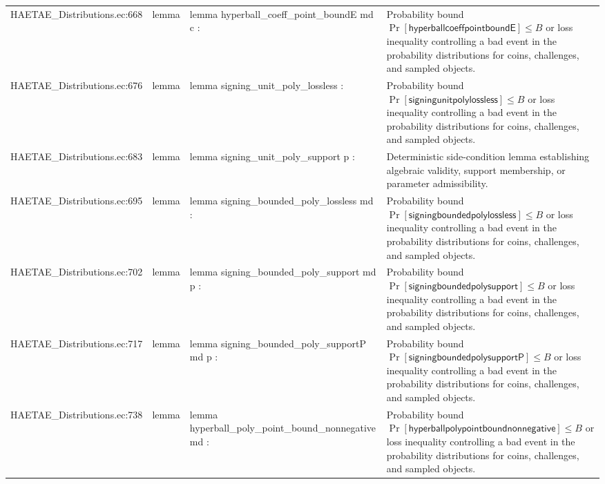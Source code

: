 \documentclass[10pt]{article}
\begin{document}
\begin{longtable}{L{0.11\textwidth}L{0.055\textwidth}L{0.385\textwidth}L{0.41\textwidth}}
HAETAE\_\allowbreak{}Distributions.\allowbreak{}ec:\allowbreak{}668 & lemma & {\ttfamily\scriptsize lemma hyperball\_\allowbreak{}coeff\_\allowbreak{}point\_\allowbreak{}boundE md c :} & Probability bound $\Pr[\mathsf{hyperballcoeffpointboundE}]\le B$ or loss inequality controlling a bad event in the probability distributions for coins, challenges, and sampled objects. \\
HAETAE\_\allowbreak{}Distributions.\allowbreak{}ec:\allowbreak{}676 & lemma & {\ttfamily\scriptsize lemma signing\_\allowbreak{}unit\_\allowbreak{}poly\_\allowbreak{}lossless :} & Probability bound $\Pr[\mathsf{signingunitpolylossless}]\le B$ or loss inequality controlling a bad event in the probability distributions for coins, challenges, and sampled objects. \\
HAETAE\_\allowbreak{}Distributions.\allowbreak{}ec:\allowbreak{}683 & lemma & {\ttfamily\scriptsize lemma signing\_\allowbreak{}unit\_\allowbreak{}poly\_\allowbreak{}support p :} & Deterministic side-condition lemma establishing algebraic validity, support membership, or parameter admissibility. \\
HAETAE\_\allowbreak{}Distributions.\allowbreak{}ec:\allowbreak{}695 & lemma & {\ttfamily\scriptsize lemma signing\_\allowbreak{}bounded\_\allowbreak{}poly\_\allowbreak{}lossless md :} & Probability bound $\Pr[\mathsf{signingboundedpolylossless}]\le B$ or loss inequality controlling a bad event in the probability distributions for coins, challenges, and sampled objects. \\
HAETAE\_\allowbreak{}Distributions.\allowbreak{}ec:\allowbreak{}702 & lemma & {\ttfamily\scriptsize lemma signing\_\allowbreak{}bounded\_\allowbreak{}poly\_\allowbreak{}support md p :} & Probability bound $\Pr[\mathsf{signingboundedpolysupport}]\le B$ or loss inequality controlling a bad event in the probability distributions for coins, challenges, and sampled objects. \\
HAETAE\_\allowbreak{}Distributions.\allowbreak{}ec:\allowbreak{}717 & lemma & {\ttfamily\scriptsize lemma signing\_\allowbreak{}bounded\_\allowbreak{}poly\_\allowbreak{}supportP md p :} & Probability bound $\Pr[\mathsf{signingboundedpolysupportP}]\le B$ or loss inequality controlling a bad event in the probability distributions for coins, challenges, and sampled objects. \\
HAETAE\_\allowbreak{}Distributions.\allowbreak{}ec:\allowbreak{}738 & lemma & {\ttfamily\scriptsize lemma hyperball\_\allowbreak{}poly\_\allowbreak{}point\_\allowbreak{}bound\_\allowbreak{}nonnegative md :} & Probability bound $\Pr[\mathsf{hyperballpolypointboundnonnegative}]\le B$ or loss inequality controlling a bad event in the probability distributions for coins, challenges, and sampled objects. \\

\end{longtable}
\end{document}
